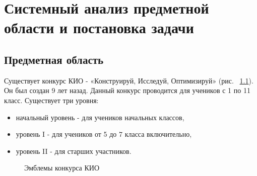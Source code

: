 \chapter{Системный анализ предметной области и постановка задачи }
\section{Предметная область}
Существует конкурс КИО - «Конструируй, Исследуй, Оптимизируй» (рис. ~\ref{KIOemblem}). Он был создан 9 лет назад. Данный конкурс проводится для учеников с 1 по 11 класс. Существует три уровня: 
 \begin{itemize}
        \item начальный уровень - для учеников начальных классов,
        \item уровень I - для учеников от 5 до 7 класса включительно,
        \item уровень II - для старших участников. 
    \end{itemize}


\begin{figure}[h]
\begin{minipage}[h]{0.49\linewidth}
\end{minipage}
\hfill
\begin{minipage}[h]{0.49\linewidth}
\end{minipage}
\caption{Эмблемы конкурса КИО}
\label{KIOemblem}
\end{figure}

